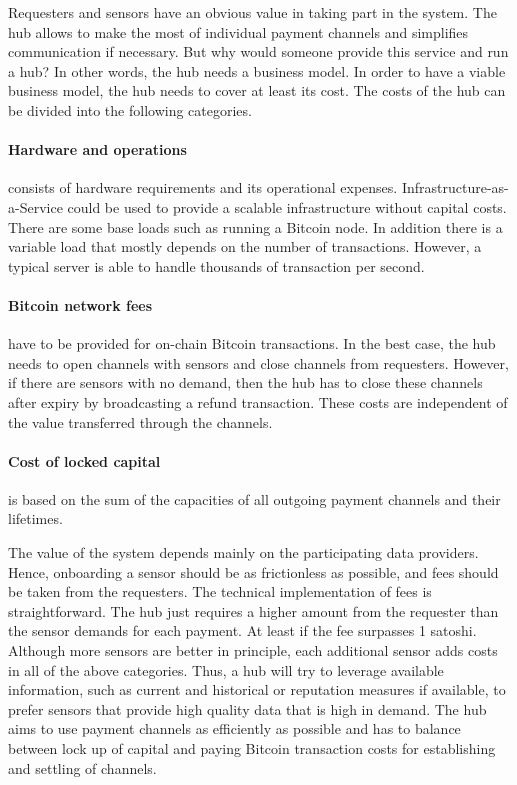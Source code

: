 Requesters and sensors have an obvious value in taking part in the system. The hub allows to make the most of individual payment channels and simplifies communication if necessary. But why would someone provide this service and run a hub? In other words, the hub needs a business model. In order to have a viable business model, the hub needs to cover at least its cost. The costs of the hub can be divided into the following categories. 

\paragraph{Hardware and operations} consists of hardware requirements and its operational expenses. Infrastructure-as-a-Service could be used to provide a scalable infrastructure without capital costs. There are some base loads such as running a Bitcoin node. In addition there is a variable load that mostly depends on the number of transactions. However, a typical server is able to handle thousands of transaction per second.

\paragraph{Bitcoin network fees} have to be provided for on-chain Bitcoin transactions. In the best case, the hub needs to open channels with sensors and close channels from requesters. However, if there are sensors with no demand, then the hub has to close these channels after expiry by broadcasting a refund transaction. These costs are independent of the value transferred through the channels.

\paragraph{Cost of locked capital} is based on the sum of the capacities of all outgoing payment channels and their lifetimes.

The value of the system depends mainly on the participating data providers. Hence, onboarding a sensor should be as frictionless as possible, and fees should be taken from the requesters. The technical implementation of fees is straightforward. The hub just requires a higher amount from the requester than the sensor demands for each payment. At least if the fee surpasses 1 satoshi. Although more sensors are better in principle, each additional sensor adds costs in all of the above categories. Thus, a hub will try to leverage available information, such as current and historical or reputation measures if available, to prefer sensors that provide high quality data that is high in demand. The hub aims to use payment channels as efficiently as possible and has to balance between lock up of capital and paying Bitcoin transaction costs for establishing and settling of channels.


